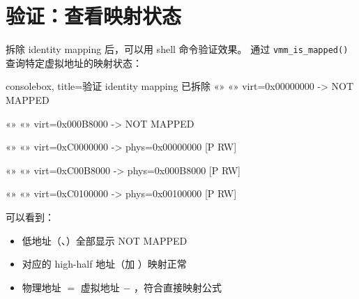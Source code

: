 \section{验证：查看映射状态}

拆除 identity mapping 后，可以用 shell 命令验证效果。
通过 \texttt{vmm\_is\_mapped()} 查询特定虚拟地址的映射状态：

\begin{tcblisting}{consolebox, title={验证 identity mapping 已拆除}}
«\tpk{>}» «»
  virt=0x00000000 -> NOT MAPPED

«\tpk{>}» «»
  virt=0x000B8000 -> NOT MAPPED

«\tpk{>}» «»
  virt=0xC0000000 -> phys=0x00000000 [P RW]

«\tpk{>}» «»
  virt=0xC00B8000 -> phys=0x000B8000 [P RW]

«\tpk{>}» «»
  virt=0xC0100000 -> phys=0x00100000 [P RW]
\end{tcblisting}

可以看到：
\begin{itemize}
  \item 低地址（、）全部显示 NOT MAPPED
  \item 对应的 high-half 地址（加 ）映射正常
  \item 物理地址 $=$ 虚拟地址 $-$ ，符合直接映射公式
\end{itemize}


